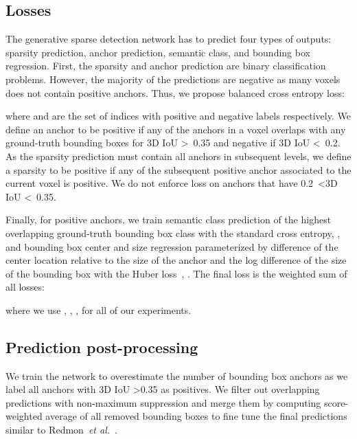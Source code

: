 \documentclass[runningheads]{llncs}
\newcommand{\etal}{\textit{et al.}}
\begin{document}
\subsection{Losses}
The generative sparse detection network has to predict four types of outputs: sparsity prediction, anchor prediction, semantic class, and bounding box regression.
First, the sparsity and anchor prediction are binary classification problems. However, the majority of the predictions are negative as many voxels does not contain positive anchors. Thus, we propose balanced cross entropy loss:

where  and  are the set of indices with positive and negative labels respectively.
We define an anchor to be positive if any of the anchors in a voxel overlaps with any ground-truth bounding boxes for 3D IoU \textgreater~0.35 and negative if 3D IoU \textless~0.2. As the sparsity prediction must contain all anchors in subsequent levels, we define a sparsity to be positive if any of the subsequent positive anchor associated to the current voxel is positive. We do not enforce loss on anchors that have 0.2~\textless 3D IoU \textless~0.35.





Finally, for positive anchors, we train semantic class prediction of the highest overlapping ground-truth bounding box class with the standard cross entropy, , and bounding box center and size regression parameterized by difference of the center location relative to the size of the anchor and the log difference of the size of the bounding box with the Huber loss~\cite{ren2015faster}, . The final loss is the weighted sum of all losses:

where we use , , ,  for all of our experiments.





\subsection{Prediction post-processing}
We train the network to overestimate the number of bounding box anchors as we label all anchors with 3D IoU \textgreater 0.35 as positives. We filter out overlapping predictions with non-maximum suppression and merge them by computing score-weighted average of all removed bounding boxes to fine tune the final predictions similar to Redmon~\etal~\cite{redmon2017yolo9000}.
\end{document}
